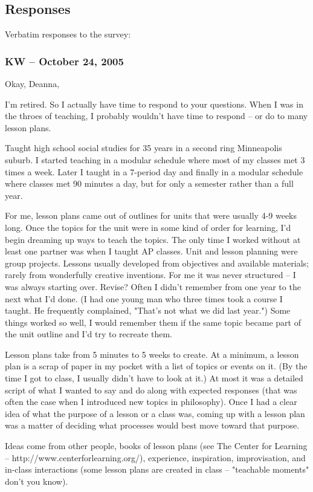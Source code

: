 \documentclass[10pt,letter]{article}
\begin{document}
\subsection{Responses}
Verbatim responses to the survey:

\subsubsection{KW -- October 24, 2005}
Okay, Deanna,

I'm retired. So I actually have time to respond to your questions. When I was in
the throes of teaching, I probably wouldn't have time to respond -- or do to
many lesson plans.

Taught high school social studies for 35 years in a second ring Minneapolis
suburb. I started teaching in a modular schedule where most of my classes met 3
times a week. Later I taught in a 7-period day and finally in a modular schedule
where classes met 90 minutes a day, but for only a semester rather than a full
year.

For me, lesson plans came out of outlines for units that were usually 4-9 weeks
long. Once the topics for the unit were in some kind of order for learning, I'd
begin dreaming up ways to teach the topics.  The only time I worked without at
least one partner was when I taught AP classes. Unit and lesson planning were
group projects.  Lessons usually developed from objectives and available
materials; rarely from wonderfully creative inventions. For me it was never
structured -- I was always starting over. Revise? Often I didn't remember from
one year to the next what I'd done. (I had one young man who three times took a
course I taught. He frequently complained, "That's not what we did last year.")
Some things worked so well, I would remember them if the same topic became part
of the unit outline and I'd try to recreate them.

Lesson plans take from 5 minutes to 5 weeks to create. At a minimum, a lesson
plan is a scrap of paper in my pocket with a list of topics or events on it. (By
the time I got to class, I usually didn't have to look at it.) At most it was a
detailed script of what I wanted to say and do along with expected responses
(that was often the case when I introduced new topics in philosophy). Once I had
a clear idea of what the purpose of a lesson or a class was, coming up with a
lesson plan was a matter of deciding what processes would best move toward that
purpose.

Ideas come from other people, books of lesson plans (see The Center for Learning
-- http://www.centerforlearning.org/), experience, inspiration, improvisation,
and in-class interactions (some lesson plans are created in class -- "teachable
moments" don't you know).
\end{document}
